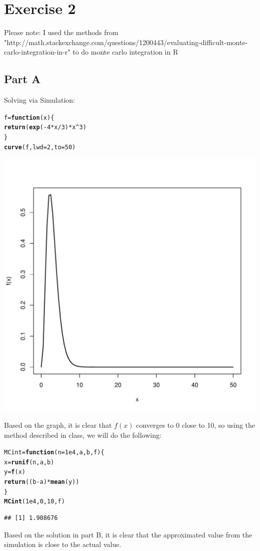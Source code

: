 \documentclass{article}\usepackage[]{graphicx}\usepackage[]{color}
\makeatletter
\newcommand{\hlnum}[1]{\textcolor[rgb]{0.686,0.059,0.569}{#1}}%
\newcommand{\hlopt}[1]{\textcolor[rgb]{0,0,0}{#1}}%
\newcommand{\hlstd}[1]{\textcolor[rgb]{0.345,0.345,0.345}{#1}}%
\newcommand{\hlkwa}[1]{\textcolor[rgb]{0.161,0.373,0.58}{\textbf{#1}}}%
\newcommand{\hlkwb}[1]{\textcolor[rgb]{0.69,0.353,0.396}{#1}}%
\newcommand{\hlkwc}[1]{\textcolor[rgb]{0.333,0.667,0.333}{#1}}%
\newcommand{\hlkwd}[1]{\textcolor[rgb]{0.737,0.353,0.396}{\textbf{#1}}}%
\newenvironment{kframe}{%
 \def\at@end@of@kframe{}%
 \ifinner\ifhmode%
  \def\at@end@of@kframe{\end{minipage}}%
  \begin{minipage}{\columnwidth}%
 \fi\fi%
 \def\FrameCommand##1{\hskip\@totalleftmargin \hskip-\fboxsep
 \colorbox{shadecolor}{##1}\hskip-\fboxsep
     \hskip-\linewidth \hskip-\@totalleftmargin \hskip\columnwidth}%
 \MakeFramed {\advance\hsize-\width
   \@totalleftmargin\z@ \linewidth\hsize
   \@setminipage}}%
 {\par\unskip\endMakeFramed%
 \at@end@of@kframe}
\newenvironment{knitrout}{}{} %
\makeatother
\begin{document}
\section*{Exercise 2}
Please note: I used the methods from "http://math.stackexchange.com/questions/1200443/evaluating-difficult-monte-carlo-integration-in-r" to do monte carlo integration in R
\subsection*{Part A}
Solving via Simulation:
\begin{knitrout}
\color{fgcolor}\begin{kframe}
\begin{alltt}
\hlstd{f} \hlkwb{=} \hlkwa{function}\hlstd{(}\hlkwc{x}\hlstd{)\{}
  \hlkwd{return}\hlstd{(}\hlkwd{exp}\hlstd{(}\hlopt{-}\hlnum{4}\hlopt{*}\hlstd{x}\hlopt{/}\hlnum{3}\hlstd{)}\hlopt{*}\hlstd{x}\hlopt{^}\hlnum{3}\hlstd{)}
\hlstd{\}}
\hlkwd{curve}\hlstd{(f,} \hlkwc{lwd}\hlstd{=}\hlnum{2}\hlstd{,}\hlkwc{to} \hlstd{=} \hlnum{50}\hlstd{)}
\end{alltt}
\end{kframe}
\includegraphics[width=0.60\linewidth]{figure/unnamed-chunk-3-1} 

\end{knitrout}
Based on the graph, it is clear that $f(x)$ converges to 0 close to 10, so using the method described in class, we will do the following:
\begin{knitrout}
\color{fgcolor}\begin{kframe}
\begin{alltt}
\hlstd{MCint} \hlkwb{=} \hlkwa{function}\hlstd{(}\hlkwc{n} \hlstd{=}\hlnum{1e4}\hlstd{,} \hlkwc{a}\hlstd{,} \hlkwc{b}\hlstd{,} \hlkwc{f}\hlstd{)\{}
  \hlstd{x} \hlkwb{=} \hlkwd{runif}\hlstd{(n, a, b)}
  \hlstd{y} \hlkwb{=} \hlkwd{f}\hlstd{(x)}
  \hlkwd{return}\hlstd{((b}\hlopt{-}\hlstd{a)}\hlopt{*}\hlkwd{mean}\hlstd{(y))}
\hlstd{\}}
\hlkwd{MCint}\hlstd{(}\hlnum{1e4}\hlstd{,}\hlnum{0}\hlstd{,}\hlnum{10}\hlstd{, f)}
\end{alltt}
\begin{verbatim}
## [1] 1.908676
\end{verbatim}
\end{kframe}
\end{knitrout}
Based on the solution in part B, it is clear that the approximated value from the simulation is close to the actual value.
\end{document}
